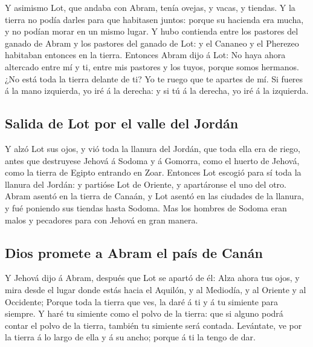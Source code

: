 Y asimismo Lot, que andaba con Abram, tenía ovejas, y
vacas, y tiendas.  Y la tierra no podía darles para que
habitasen juntos: porque su hacienda era mucha, y no podían morar en un
mismo lugar.  Y hubo contienda entre los pastores del ganado
de Abram y los pastores del ganado de Lot: y el Cananeo y el Pherezeo
habitaban entonces en la tierra.  Entonces Abram dijo á Lot:
No haya ahora altercado entre mí y ti, entre mis pastores y los tuyos,
porque somos hermanos.  ¿No está toda la tierra delante de
ti? Yo te ruego que te apartes de mí. Si fueres á la mano izquierda, yo
iré á la derecha: y si tú á la derecha, yo iré á la izquierda.

\hypertarget{salida-de-lot-por-el-valle-del-jorduxe1n}{%
\subsection{Salida de Lot por el valle del
Jordán}\label{salida-de-lot-por-el-valle-del-jorduxe1n}}

 Y alzó Lot sus ojos, y vió toda la llanura del Jordán, que
toda ella era de riego, antes que destruyese Jehová á Sodoma y á
Gomorra, como el huerto de Jehová, como la tierra de Egipto entrando en
Zoar.  Entonces Lot escogió para sí toda la llanura del
Jordán: y partióse Lot de Oriente, y apartáronse el uno del otro.
 Abram asentó en la tierra de Canaán, y Lot asentó en las
ciudades de la llanura, y fué poniendo sus tiendas hasta Sodoma.
 Mas los hombres de Sodoma eran malos y pecadores para con
Jehová en gran manera.

\hypertarget{dios-promete-a-abram-el-pauxeds-de-canuxe1n}{%
\subsection{Dios promete a Abram el país de
Canán}\label{dios-promete-a-abram-el-pauxeds-de-canuxe1n}}

 Y Jehová dijo á Abram, después que Lot se apartó de él:
Alza ahora tus ojos, y mira desde el lugar donde estás hacia el Aquilón,
y al Mediodía, y al Oriente y al Occidente;  Porque toda la
tierra que ves, la daré á ti y á tu simiente para siempre. 
Y haré tu simiente como el polvo de la tierra: que si alguno podrá
contar el polvo de la tierra, también tu simiente será contada.
 Levántate, ve por la tierra á lo largo de ella y á su
ancho; porque á ti la tengo de dar.

